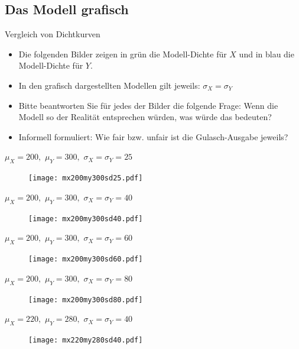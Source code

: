 \documentclass[usenames,dvipsnames,handout]{beamer}
\begin{document}
\subsection{Das Modell grafisch}

\begin{frame}{Vergleich von Dichtkurven}
\begin{itemize}
\item{Die folgenden Bilder zeigen in grün die Modell-Dichte für $X$ und in blau
die Modell-Dichte für $Y.$}
\item{In den grafisch dargestellten Modellen gilt jeweils: $\sigma_{X}=\sigma_{Y}$}
\item{Bitte beantworten Sie für jedes der Bilder die folgende Frage: 
Wenn die Modell so der Realität entsprechen würden, was würde das bedeuten?}
\item{Informell formuliert: Wie fair bzw. unfair ist die Gulasch-Ausgabe jeweils?}
\end{itemize}
\end{frame}

\begin{frame}{$\mu_{X}=200,$ $\mu_{Y}=300,$ $\sigma_{X}=\sigma_{Y}=25$}
  \begin{figure}[ht]
 	\centering
 	      \texttt{[image: mx200my300sd25.pdf]}%
 	\end{figure}
\end{frame}
%
\begin{frame}{$\mu_{X}=200,$ $\mu_{Y}=300,$ $\sigma_{X}=\sigma_{Y}=40$}
  \begin{figure}[ht]
 	\centering
 	      \texttt{[image: mx200my300sd40.pdf]}
 	\end{figure}
\end{frame}
%
\begin{frame}{$\mu_{X}=200,$ $\mu_{Y}=300,$ $\sigma_{X}=\sigma_{Y}=60$}
  \begin{figure}[ht]
 	\centering
 	      \texttt{[image: mx200my300sd60.pdf]}
 	\end{figure}
\end{frame}
%
\begin{frame}{$\mu_{X}=200,$ $\mu_{Y}=300,$ $\sigma_{X}=\sigma_{Y}=80$}
  \begin{figure}[ht]
 	\centering
 	      \texttt{[image: mx200my300sd80.pdf]}
 	\end{figure}
\end{frame}
%
\begin{frame}{$\mu_{X}=220,$ $\mu_{Y}=280,$ $\sigma_{X}=\sigma_{Y}=40$}
  \begin{figure}[ht]
 	\centering
 	      \texttt{[image: mx220my280sd40.pdf]}
 	\end{figure}
\end{frame}
\end{document}
